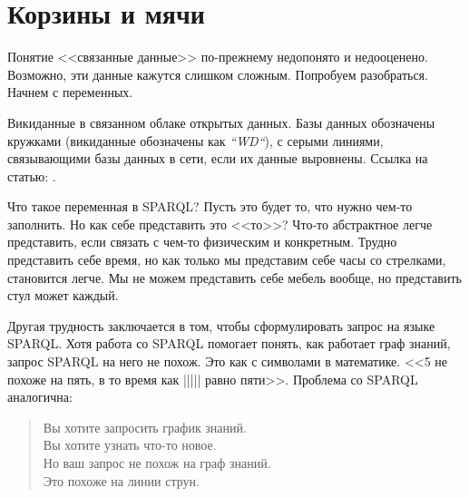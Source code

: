 \chapter{Корзины и мячи}
\label{ch:BucketsAndBalls}

Понятие <<связанные данные>> по-прежнему недопонято и недооценено. Возможно, эти данные кажутся слишком сложным. 
Попробуем разобраться. Начнем с переменных.

\begin{marginfigure}[-1.0cm]
	{
		\setlength{\fboxsep}{0pt}%
		\setlength{\fboxrule}{1pt}%
	}
    \caption{Викиданные в связанном облаке открытых данных. Базы данных обозначены кружками (викиданные обозначены как \textit{``WD``}), с серыми линиями, связывающими базы данных в сети, если их данные выровнены. Ссылка на статью: .}
	\label{fig:Wikidata_in_linked_open_data}
\end{marginfigure}

Что такое переменная в SPARQL? Пусть это будет то, что нужно чем-то заполнить. Но как себе представить это <<то>>? Что-то абстрактное легче представить, если связать с чем-то физическим и конкретным. Трудно представить себе время, но как только мы представим себе часы со стрелками, становится легче. Мы не можем представить себе мебель вообще, но представить стул может каждый.

Другая трудность заключается в том, чтобы сформулировать запрос на языке SPARQL. Хотя работа со SPARQL помогает понять, как работает граф знаний\footnotemark {}, запрос SPARQL на него не похож. Это как с символами в математике. <<5 не похоже на пять, в то время как ||||| равно пяти>>. Проблема со SPARQL аналогична:

\begin{quote}
Вы хотите запросить график знаний.\\
Вы хотите узнать что-то новое.\\
Но ваш запрос не похож на граф знаний.\\
Это похоже на линии струн.\\
\end{quote}

